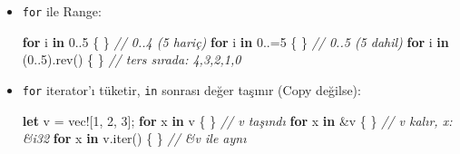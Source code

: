 \documentclass[12pt,a4paper]{article}
\newenvironment{Shaded}{}{}
\newcommand{\CommentTok}[1]{\textcolor[rgb]{0.38,0.63,0.69}{\textit{#1}}}
\newcommand{\ControlFlowTok}[1]{\textcolor[rgb]{0.00,0.44,0.13}{\textbf{#1}}}
\newcommand{\DecValTok}[1]{\textcolor[rgb]{0.25,0.63,0.44}{#1}}
\newcommand{\FunctionTok}[1]{\textcolor[rgb]{0.02,0.16,0.49}{#1}}
\newcommand{\KeywordTok}[1]{\textcolor[rgb]{0.00,0.44,0.13}{\textbf{#1}}}
\newcommand{\NormalTok}[1]{#1}
\newcommand{\OperatorTok}[1]{\textcolor[rgb]{0.40,0.40,0.40}{#1}}
\newcommand{\StringTok}[1]{\textcolor[rgb]{0.25,0.44,0.63}{#1}}
\begin{document}
\begin{itemize}
\begin{Shaded}
\begin{Highlighting}[]
\NormalTok{'outer}\OperatorTok{:} \ControlFlowTok{for}\NormalTok{ i }\KeywordTok{in} \DecValTok{0}\OperatorTok{..}\DecValTok{3} \OperatorTok{\{}
    \ControlFlowTok{for}\NormalTok{ j }\KeywordTok{in} \DecValTok{0}\OperatorTok{..}\DecValTok{3} \OperatorTok{\{}
        \ControlFlowTok{if}\NormalTok{ j }\OperatorTok{==} \DecValTok{1} \OperatorTok{\{} \ControlFlowTok{continue}\NormalTok{ 'outer}\OperatorTok{;} \OperatorTok{\}}
        \ControlFlowTok{if}\NormalTok{ i }\OperatorTok{==} \DecValTok{2} \OperatorTok{\{} \ControlFlowTok{break}\NormalTok{ 'outer}\OperatorTok{;} \OperatorTok{\}}
\NormalTok{        println}\OperatorTok{!(}\StringTok{"\{i\},\{j\}"}\OperatorTok{);}
    \OperatorTok{\}}
\OperatorTok{\}}
\end{Highlighting}
\end{Shaded}


  İlgili: etiketler \texttt{'isim:} ile başlar, \texttt{break}/\texttt{continue} içindeki değişkenlerden ayrı bir isim alanıdır
\item
  \texttt{for} ile Range:

\begin{Shaded}
\begin{Highlighting}[]
\ControlFlowTok{for}\NormalTok{ i }\KeywordTok{in} \DecValTok{0}\OperatorTok{..}\DecValTok{5} \OperatorTok{\{} \OperatorTok{\}}     \CommentTok{// 0..4 (5 hariç)}
\ControlFlowTok{for}\NormalTok{ i }\KeywordTok{in} \DecValTok{0}\OperatorTok{..=}\DecValTok{5} \OperatorTok{\{} \OperatorTok{\}}    \CommentTok{// 0..5 (5 dahil)}
\ControlFlowTok{for}\NormalTok{ i }\KeywordTok{in} \OperatorTok{(}\DecValTok{0}\OperatorTok{..}\DecValTok{5}\OperatorTok{).}\FunctionTok{rev}\OperatorTok{()} \OperatorTok{\{} \OperatorTok{\}}   \CommentTok{// ters sırada: 4,3,2,1,0}
\end{Highlighting}
\end{Shaded}
\item
  \texttt{for} iterator'ı tüketir, \texttt{in} sonrası değer taşınır (Copy değilse):

\begin{Shaded}
\begin{Highlighting}[]
\KeywordTok{let}\NormalTok{ v }\OperatorTok{=}\NormalTok{ vec}\OperatorTok{![}\DecValTok{1}\OperatorTok{,} \DecValTok{2}\OperatorTok{,} \DecValTok{3}\OperatorTok{];}
\ControlFlowTok{for}\NormalTok{ x }\KeywordTok{in}\NormalTok{ v }\OperatorTok{\{} \OperatorTok{\}}        \CommentTok{// v taşındı}
\ControlFlowTok{for}\NormalTok{ x }\KeywordTok{in} \OperatorTok{\&}\NormalTok{v }\OperatorTok{\{} \OperatorTok{\}}       \CommentTok{// v kalır, x: \&i32}
\ControlFlowTok{for}\NormalTok{ x }\KeywordTok{in}\NormalTok{ v}\OperatorTok{.}\FunctionTok{iter}\OperatorTok{()} \OperatorTok{\{} \OperatorTok{\}} \CommentTok{// \&v ile aynı}
\end{Highlighting}
\end{Shaded}



\end{itemize}
\end{document}
